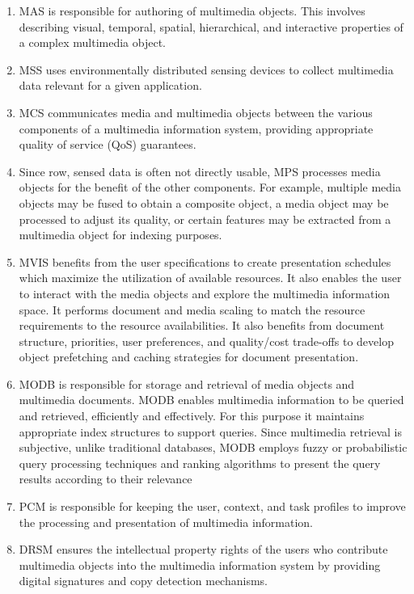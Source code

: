 \begin{enumerate}
	\item MAS is responsible for authoring of multimedia objects. This involves describing visual, temporal, spatial, hierarchical, and interactive properties of a
	complex multimedia object.
	
	\item  MSS uses environmentally distributed sensing	devices to collect multimedia data relevant for a given application.
	
	\item  MCS communicates media and multimedia objects between the various components of a multimedia
	information system, providing appropriate quality of service (QoS) guarantees.
	
	\item Since row, sensed data is often not directly usable,
	MPS processes media objects for the benefit of the
	other components. For example, multiple media
	objects may be fused to obtain a composite object,
	a media object may be processed to adjust its quality, or certain features may be extracted from a
	multimedia object for indexing purposes.
	
	\item  MVIS benefits from the user specifications to create	presentation schedules which maximize the utilization of available resources. It also enables the user
	to interact with the media objects and explore the	multimedia information space. It performs document and media scaling to match the resource requirements to the resource availabilities. It also benefits from document structure, priorities, user	preferences, and quality/cost trade-offs to develop object prefetching and caching strategies for document presentation.
	
	\item  MODB is responsible for storage and retrieval of	media objects and multimedia documents. MODB enables multimedia information to be queried and retrieved, efficiently and effectively. For this purpose it maintains appropriate index structures	to support queries. Since multimedia retrieval is subjective, unlike traditional databases, MODB employs fuzzy or probabilistic query processing techniques and ranking algorithms to present the query results according to their relevance
	
	\item PCM is responsible for keeping the user, context,	and task profiles to improve the processing and	presentation of multimedia information.
	
	
	\item DRSM ensures the intellectual property rights of	the users who contribute multimedia objects into the multimedia information system by providing	digital signatures and copy detection mechanisms.
\end{enumerate}


